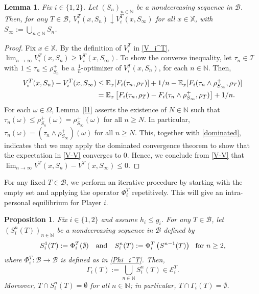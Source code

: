 \documentclass[11pt,reqno]{article}
\numberwithin{equation}{section}
\newtheorem{lemma}{Lemma}[section]
\newtheorem{proposition}{Proposition}[section]
\newcommand{\lemref}{Lemma~\ref}
\renewcommand{\P}{\mathbb{P}}
\newcommand{\E}{\mathbb{E}}
\newcommand{\cE}{\mathcal{E}}
\newcommand{\N}{\mathbb{N}}
\newcommand{\X}{\mathbb{X}}
\newcommand{\B}{\mathcal{B}}
\newcommand{\T}{\mathcal{T}}
\begin{document}
\begin{lemma}\label{l2}
Fix $i\in\{1,2\}$. %
Let $(S_n)_{n\in\N}$ be a nondecreasing sequence in $\B$. Then, for any $T\in\B$, $V_i^T(x,S_n)\downarrow V_i^T(x,S_\infty)$ for all $x\in\X$, with $S_\infty:= \bigcup_{n\in\N} S_n$.
\end{lemma}

\begin{proof}
Fix $x\in\X$. By the definition of $V_i^T$ in \eqref{V_i^T}, $\lim_{n\to\infty}V_i^T(x,S_n)\geq V_i^T(x,S_\infty)$. To show the converse inequality, let $\tau_n\in\T$ with $1\le \tau_n\le \rho^+_{S_n}$ be a $\frac{1}{n}$-optimizer of $V_i^T(x,S_n)$, for each $n\in\N$. Then,
\begin{align}
V_i^T(x,S_n)-V_i^T(x,S_\infty)&\leq \E_x[F_i(\tau_n,\rho_T)]+{1}/{n}-\E_x[F_i(\tau_n\wedge\rho^+_{S_\infty},\rho_T)]\notag\\
&= \E_x\left[F_i(\tau_n,\rho_T)-F_i(\tau_n\wedge\rho^+_{S_\infty},\rho_T)\right]+1/n.\label{V-V} %
\end{align}
For each $\omega\in\Omega$, \lemref{l1} asserts the existence of $N\in\N$ such that $\tau_n(\omega)\leq\rho^+_{S_n}(\omega)=\rho^+_{S_\infty}(\omega)$ for all $n\ge N$. In particular, $\tau_n(\omega)= (\tau_n\wedge\rho^+_{S_\infty})(\omega)$ for all $n\ge N$. This, together with \eqref{dominated}, indicates that we may apply the dominated convergence theorem to show that the expectation in \eqref{V-V} converges to $0$. Hence, we conclude from \eqref{V-V} that  $\lim_{n\to\infty}V^T(x,S_n)-V^T(x,S_\infty)\le0$.
\end{proof}

For any fixed $T\in\B$, we perform an iterative procedure by starting with the empty set and applying the operator $\Phi_i^T$ repetitively. This will give an intra-personal equilibrium for Player $i$.

\begin{proposition}\label{l3}
Fix $i\in\{1,2\}$ and assume $h_i\leq g_i$. For any $T\in\B$, let $\left(S_i^n(T)\right)_{n\in\N}$ be a nondecreasing sequence in $\B$ defined by
\begin{equation}\label{S_n}
S_i^1(T) := \Phi_i^T(\emptyset)\quad \hbox{and}\quad S_i^n(T) := \Phi_i^T\left(S^{n-1}(T)\right)\ \ \hbox{for}\ n\ge 2,
\end{equation}
where $\Phi_i^T:\B\to\B$ is defined as in \eqref{Phi_i^T}. Then, 
\begin{equation}\label{S_infty}
\Gamma_i(T):=\bigcup_{n\in\N} S_i^n(T)\in\cE_i^T.
\end{equation} 
Moreover, $T\cap S_i^n(T)=\emptyset$ for all $n\in\N$; in particular, $T\cap\Gamma_i(T)=\emptyset$.  
\end{proposition}
\end{document}
